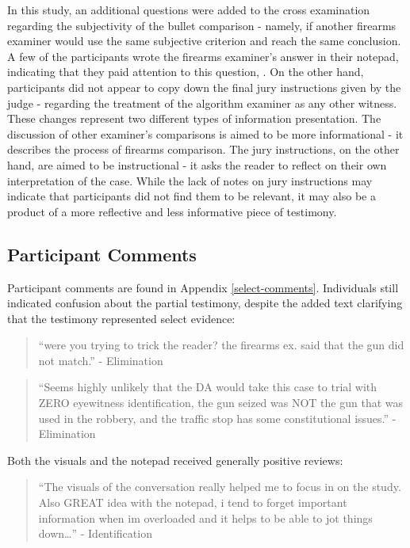 \documentclass[print]{nuthesis}
\begin{document}
In this study, an additional questions were added to the cross examination regarding the subjectivity of the bullet comparison - namely, if another firearms examiner would use the same subjective criterion and reach the same conclusion.
A few of the participants wrote the firearms examiner's answer in their notepad, indicating that they paid attention to this question, .
On the other hand, participants did not appear to copy down the final jury instructions given by the judge - regarding the treatment of the algorithm examiner as any other witness.
These changes represent two different types of information presentation.
The discussion of other examiner's comparisons is aimed to be more informational - it describes the process of firearms comparison.
The jury instructions, on the other hand, are aimed to be instructional - it asks the reader to reflect on their own interpretation of the case.
While the lack of notes on jury instructions may indicate that participants did not find them to be relevant, it may also be a product of a more reflective and less informative piece of testimony.

\hypertarget{participant-comments}{%
\subsection{Participant Comments}\label{participant-comments}}

Participant comments are found in Appendix \ref{select-comments}.
Individuals still indicated confusion about the partial testimony, despite the added text clarifying that the testimony represented select evidence:

\begin{quote}
``were you trying to trick the reader? the firearms ex. said that the gun did not match.'' - Elimination
\end{quote}

\begin{quote}
``Seems highly unlikely that the DA would take this case to trial with ZERO eyewitness identification, the gun seized was NOT the gun that was used in the robbery, and the traffic stop has some constitutional issues.'' - Elimination
\end{quote}

Both the visuals and the notepad received generally positive reviews:

\begin{quote}
``The visuals of the conversation really helped me to focus in on the study. Also GREAT idea with the notepad, i tend to forget important information when im overloaded and it helps to be able to jot things down\ldots{}'' - Identification
\end{quote}
\end{document}
